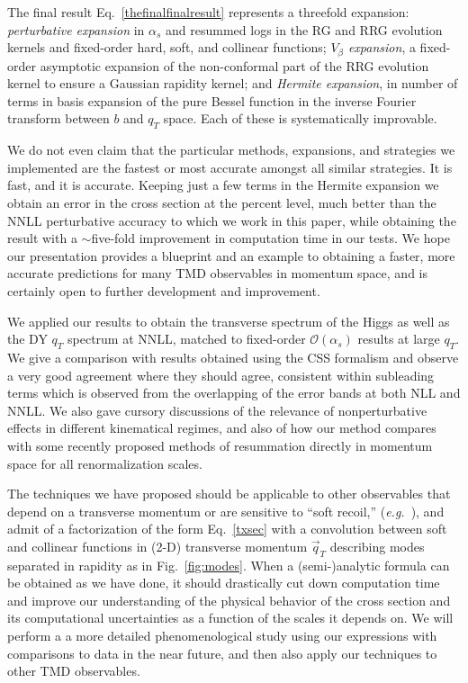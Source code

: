 \documentclass[a4,letterpaper,11pt]{article}
\newcommand{\as}{\alpha_s}
\newcommand{\eg}{\emph{e.g.}~}
\newcommand{\cO}{\mathcal{O}}
\newcommand{\eq}[1]{Eq.~\eqref{#1}}
\newcommand{\fig}[1]{Fig.~\ref{fig:#1}}
\begin{document}
The final result \eq{thefinalfinalresult} represents a threefold expansion: \emph{perturbative expansion} in $\as$ and resummed logs in the RG and RRG evolution kernels and fixed-order hard, soft, and collinear functions; \emph{$V_\beta$ expansion}, a fixed-order asymptotic expansion of the non-conformal part of the RRG evolution kernel to ensure a Gaussian rapidity kernel; and \emph{Hermite expansion}, in number of terms in basis expansion of the pure Bessel function in the inverse Fourier transform between $b$ and $q_T$ space. Each of these is systematically improvable. 

We do not even claim that the particular methods, expansions, and strategies we implemented are the fastest or most accurate amongst all similar strategies. It is fast, and it is accurate.  Keeping just a few terms in the Hermite expansion we obtain an error in the cross section at the percent level, much better than the NNLL perturbative accuracy to which we work in this paper, while obtaining the result with a $\sim$five-fold improvement in computation time in our tests. We hope our presentation provides a blueprint and an example to obtaining a faster, more accurate predictions for many TMD observables in momentum space, and is certainly open to further development and improvement.

We applied our results to obtain the transverse spectrum of the Higgs as well as the DY $q_T$ spectrum at NNLL, matched to fixed-order $\cO(\as)$ results at large $q_T$. We give a comparison  with results obtained using the CSS formalism and observe a very good agreement where they should agree, consistent within subleading terms which is observed from the overlapping of the error bands at both NLL and NNLL. We also gave cursory discussions of the relevance of nonperturbative effects in different kinematical regimes, and also of how our method compares with some recently proposed methods of resummation directly in momentum space for all renormalization scales. 

The techniques we have proposed should be applicable to other observables that depend on a transverse momentum or are sensitive to ``soft recoil,'' (\eg \cite{Chiu:2011qc,Chiu:2012ir}), and admit of a factorization of the form \eq{txsec} with a convolution between soft and collinear functions in (2-D) transverse momentum $\vec{q}_T$ describing modes separated in rapidity as in \fig{modes}. When a (semi-)analytic formula can be obtained as we have done, it should drastically cut down computation time and improve our understanding of the physical behavior of the cross section and its computational uncertainties as a function of the scales it depends on. 
We will perform a a more detailed phenomenological study using our expressions with comparisons to data in the near future, and then also apply our techniques to other TMD observables.
\end{document}
